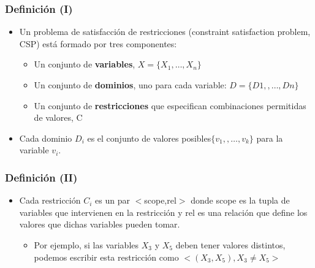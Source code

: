 \documentclass{beamer}
\begin{document}
\begin{frame}  \frametitle{Definición (I)} \footnotesize

\begin{itemize}
\item Un problema de satisfacción de restricciones (constraint satisfaction problem, CSP) está formado por tres componentes:

\begin{itemize}
\item Un conjunto de \textbf{variables}, $X=\{X_1,\ldots ,X_n\}$
\item Un conjunto de \textbf{dominios}, uno para cada variable: $D=\{D1,,\ldots , Dn\}$
\item Un conjunto de \textbf{restricciones} que especifican combinaciones permitidas de valores, C
\end{itemize}

\item Cada dominio $D_i$ es el conjunto de valores posibles$ \{v_1,,\ldots, v_k\}$ para la variable $v_i$.
\end{itemize}

\end{frame} 


\begin{frame}  \frametitle{Definición (II)} \footnotesize

\begin{itemize}
\item Cada restricción $C_i$ es un par $<$scope,rel$>$ donde scope es la tupla de variables que intervienen en la restricción y rel es una relación que define los valores que dichas variables pueden tomar.

\begin{itemize}
\item Por ejemplo, si las variables $X_3$ y $X_5$ deben tener valores distintos, podemos escribir esta restricción como $< (X_3,X_5), X_3 \neq X_5 >$

\end{itemize}

\end{itemize}

\end{frame} 

\end{document}
